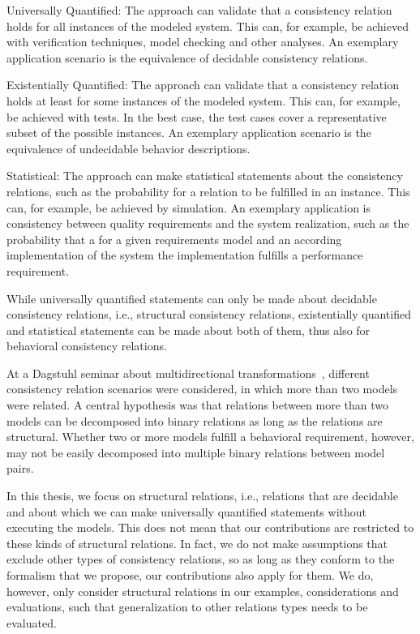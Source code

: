 \begin{properdescription}
    \item[Universally Quantified:] The approach can validate that a consistency relation holds for all instances of the modeled system. This can, for example, be achieved with verification techniques, model checking and other analyses. An exemplary application scenario is the equivalence of decidable consistency relations.
    \item[Existentially Quantified:] The approach can validate that a consistency relation holds at least for some instances of the modeled system. This can, for example, be achieved with tests. In the best case, the test cases cover a representative subset of the possible instances. An exemplary application scenario is the equivalence of undecidable behavior descriptions.
    \item[Statistical:] The approach can make statistical statements about the consistency relations, such as the probability for a relation to be fulfilled in an instance. This can, for example, be achieved by simulation. An exemplary application is consistency between quality requirements and the system realization, such as the probability that a for a given requirements model and an according implementation of the system the implementation fulfills a performance requirement.
\end{properdescription}
While universally quantified statements can only be made about decidable consistency relations, i.e., structural consistency relations, existentially quantified and statistical statements can be made about both of them, thus also for behavioral consistency relations.

At a Dagstuhl seminar about multidirectional transformations~\cite{cleve2019dagstuhl}, different consistency relation scenarios were considered, in which more than two models were related.
A central hypothesis was that relations between more than two models can be decomposed into binary relations as long as the relations are structural.
Whether two or more models fulfill a behavioral requirement, however, may not be easily decomposed into multiple binary relations between model pairs.

In this thesis, we focus on structural relations, i.e., relations that are decidable and about which we can make universally quantified statements without executing the models.
This does not mean that our contributions are restricted to these kinds of structural relations.
In fact, we do not make assumptions that exclude other types of consistency relations, so as long as they conform to the formalism that we propose, our contributions also apply for them.
We do, however, only consider structural relations in our examples, considerations and evaluations, such that generalization to other relations types needs to be evaluated.


